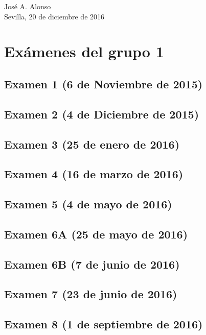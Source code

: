 \documentclass[a4paper,12pt,twoside]{book}
\begin{document}
\begin{flushright}
  José A. Alonso \\
  Sevilla, 20 de diciembre de 2016
\end{flushright}

\chapter{Exámenes del grupo 1}
\section{Examen 1 (6 de Noviembre de 2015)}
\section{Examen 2 (4 de Diciembre de 2015)}
\section{Examen 3 (25 de enero de 2016)}
 \label{examen_15_16_1_3}
\section{Examen 4 (16 de marzo de 2016)}
\section{Examen 5 (4 de mayo de 2016)}
\section{Examen 6A (25 de mayo de 2016)}
\section{Examen 6B (7 de junio de 2016)} 
 \label{examen_15_16_1_6}
\section{Examen 7 (23 de junio de 2016)}
  \label{examen_15_16_1_7}
\section{Examen 8 (1 de septiembre de 2016)}
  \label{examen_15_16_1_8}
\end{document}
